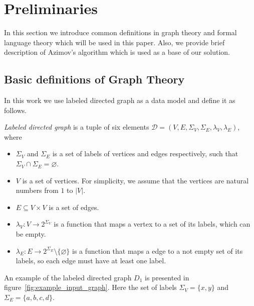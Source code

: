 \section{Preliminaries}

In this section we introduce common definitions in graph theory and formal language theory which will be used in this paper. 
Also, we provide brief description of Azimov's algorithm which is used as a base of our solution.

\subsection{Basic definitions of Graph Theory}

In this work we use labeled directed graph as a data model and define it as follows.
\begin{definition} \emph{Labeled directed graph} is a tuple of six elements $\mathcal{D} = (V, E, \Sigma_V, \Sigma_E, \lambda_V, \lambda_E)$, where
\begin{itemize}
    \item $\Sigma_V$ and $\Sigma_E$ is a set of labels of vertices and edges respectively, such that $\Sigma_V \cap \Sigma_E = \varnothing$.
    \item $V$ is a set of vertices. For simplicity, we assume that the vertices are natural numbers from $1$ to $|V|$.
    \item $E \subseteq V \times V$ is a set of edges.
    \item $\lambda_V : V \xrightarrow{} 2^{\Sigma_V}$ is a function that maps a vertex to a set of its labels, which can be empty.
    \item $\lambda_E : E \xrightarrow{} 2^{\Sigma_E} \setminus \{\varnothing\}$ is a function that maps a edge to a not empty set of its labels, so each edge must have at least one label.
\end{itemize}
\end{definition}

An example of the labeled directed graph $D_1$ is presented in figure~\ref{fig:example_input_graph}. Here the set of labels $\Sigma_V = \{x, y\}$ and $\Sigma_E = \{a, b, c, d\}$.

